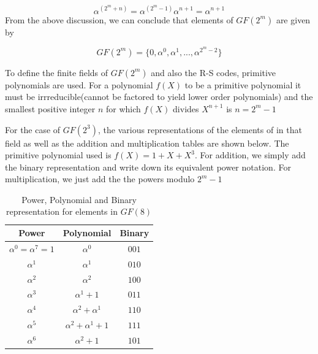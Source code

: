 \documentclass[fontsize=12pt]{article}
\begin{document}
\begin{equation}
\alpha^{(2^m+n)} = \alpha^{(2^m-1)}\alpha^{n+1} =\alpha^{n+1}
\label{three}
\end{equation}
From the above discussion, we can conclude that elements of $GF(2^m)$ are given by

\begin{equation}
	GF(2^m) = \{ 0,\alpha ^0,\alpha^1,...,\alpha ^{2^m-2} \}
	\label{four}
\end{equation}

To define the finite fields of $GF(2^m)$ and also the R-S codes, primitive polynomials are used. For a polynomial $f(X)$ to be a primitive polynomial it must be irrreducible(cannot be factored to yield lower order polynomials) and the smallest positive integer $n$ for which $f(X)$ divides $X^{n+1}$ is $n=2^m-1$

For the case of $GF(2^3)$, the various representations of the elements of in that field as well as the addition and multiplication tables are shown below. The primitive polynomial used is $f(X)=1+X+X^3$. For addition, we simply add the binary representation and write down its equivalent power notation. For multiplication, we just add the the powers modulo $2^m-1$

\begin{table}[h]
\caption{Power, Polynomial and Binary representation for elements in $GF(8)$ }
\centering
\begin{tabular}{ |c||c||c| } 
 \hline
 
 Power &Polynomial & Binary \\
 \hline 
  \hline 
  $\alpha^0 = \alpha^7 =1$ &$\alpha^0$ & $0 0 1$ \\
 \hline 
   $\alpha^1$ &$\alpha^1$ & $0 1 0$\\ 
  \hline 
   $\alpha^2$ &$\alpha^2$ & $1 0 0$ \\ 
  \hline 
   $\alpha^3$ &$\alpha^1 + 1$ & $0 1 1$\\ 
  \hline 
  $\alpha^4$ &$\alpha^2 + \alpha^1$ & $1 1 0$ \\ 
 \hline 
   $\alpha^5$ &$\alpha^2 + \alpha^1 +1 $ & $1 1 1$\\ 
  \hline 
   $\alpha^6$ &$\alpha^2 + 1$ & $1 0 1$ \\ 
  \hline 
  
\end{tabular}


\end{table}
\end{document}
